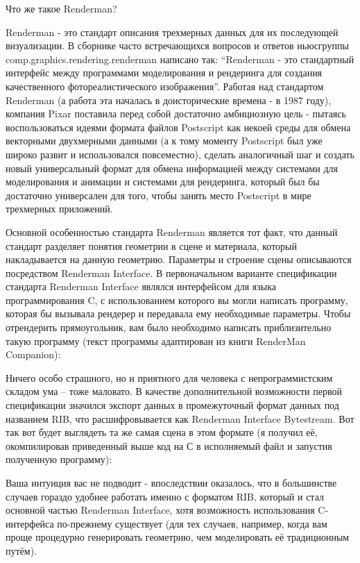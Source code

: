Что же  такое Renderman? 

Renderman - это стандарт описания трехмерных данных для их последующей визуализации. В сборнике часто встречающихся вопросов и ответов ньюсгруппы
comp.graphics.rendering.renderman написано так: “Renderman - это стандартный интерфейс между программами моделирования и рендеринга для создания качественного
фотореалистического изображения”. Работая над стандартом Renderman (а работа эта началась в доисторические времена - в 1987 году), компания Pixar поставила перед собой
достаточно амбициозную цель - пытаясь воспользоваться идеями формата файлов Postscript как некоей среды для обмена векторными двухмерными данными (а к тому моменту
Postscript был уже широко развит и использовался повсеместно), сделать аналогичный шаг и создать новый универсальный формат для обмена информацией между системами для
моделирования и анимации и системами для рендеринга, который был бы достаточно универсален для того, чтобы занять место Postscript в мире трехмерных приложений.
  

Основной особенностью стандарта Renderman является тот факт, что данный стандарт разделяет понятия геометрии в сцене и материала, который накладывается на данную
геометрию. Параметры и строение сцены описываются посредством Renderman Interface. В первоначальном варианте спецификации стандарта Renderman Interface являлся
интерфейсом для языка программирования C, с использованием которого вы могли написать программу, которая бы вызывала рендерер и передавала ему необходимые параметры.
Чтобы отрендерить прямоугольник, вам было необходимо написать приблизительно такую программу (текст программы адаптирован из книги RenderMan Companion):
  

 Ничего особо страшного, но и приятного для человека
    с непрограммистским складом ума – тоже маловато. В качестве
    дополнительной возможности первой спецификации значился экспорт
    данных в промежуточный формат данных под названием RIB,
    что расшифровывается как Renderman Interface Bytestream. Вот
    так вот будет выглядеть та же самая сцена в этом формате (я получил
    её, окомпилировав приведенный выше код на С в исполняемый файл и
    запустив полученную программу):


 Ваша интуиция вас не подводит - впоследствии
    оказалось,  что в
    большинстве случаев гораздо удобнее работать именно с
    форматом RIB, который и
    стал основной частью Renderman Interface, хотя
    возможность использования C-интерфейса
    по-прежнему существует (для тех случаев, например, когда вам проще
    процедурно генерировать геометрию, чем моделировать её традиционным
    путём).
  

